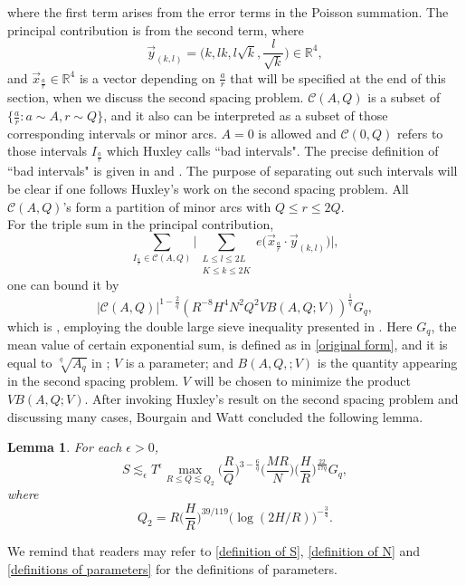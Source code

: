 \documentclass[11pt]{amsart}
\numberwithin{equation}{section}
\newtheorem{lemma}[theorem]{Lemma}
\theoremstyle{definition}
\theoremstyle{proposition}
\begin{document}
where the first term arises from the error terms in the Poisson summation. 
The principal contribution is from the second term, where 
\[
\Vec{y}_{(k,l)}=\Big(k,lk,l\sqrt{k},\frac{l}{\sqrt{k}}\Big)\in \mathbb R^4, 
\]
and $\Vec{x}_{\frac{a}{r}} \in \mathbb R^4$ is a vector depending on $\frac{a}{r}$ that will be specified at the end of this section, when we discuss the second spacing problem.
$\mathcal{C}(A,Q)$ is a subset of $\{\frac{a}{r}:a\sim A, r\sim Q\}$, and it also can be interpreted as a subset of those corresponding intervals or minor arcs. $A=0$ is allowed and $\mathcal{C}(0,Q)$ refers to those intervals 
$I_{\frac{a}{r}}$ which Huxley calls ``bad intervals". The precise definition of ``bad intervals" is given in \cite[Section 2]{HuxleyZeta5} and \cite[Section 2]{Huxley03}.
The purpose of separating out such intervals will be clear if one follows Huxley's work on the second spacing problem.  All $\mathcal{C}(A,Q)$'s  form a partition of minor arcs with $Q\le r\le 2Q$.  \\

For the triple sum in the principal contribution,
\[
\sum_{I_{\frac{a}{r}}\in \mathcal{C}(A,Q)}\Big| \mathop{\sum}\limits_{\substack{L\le l\le 2L \\K\le k\le 2K}} e\Big( \Vec{x}_{\frac{a}{r}}\cdot \Vec{y}_{(k,l)} \Big) \Big|, 
\]
one can bound it by 
\[
|\mathcal{C}(A,Q)|^{1-\frac{2}{q}} (R^{-8}H^4N^2Q^2 V B(A,Q;V))^{\frac{1}{q}}G_q,  
\]
which is \cite[(5.12)]{BourgainWatt2nd}, employing the double large sieve inequality presented in \cite[Sections 5]{BourgainWatt1st}. Here $G_q$, the mean value of certain exponential sum, is defined as in \eqref{original form}, and it is equal to $\sqrt[q]{A_q}$ in \cite{BourgainWatt2nd}; $V$ is a parameter; and $B(A,Q,;V)$ is the quantity appearing in the second spacing problem. $V$ will be chosen to minimize the product $V B(A,Q;V)$. After invoking Huxley's result on the second spacing problem \cite{Huxley03} and discussing many cases, Bourgain and Watt concluded the following lemma. 
\begin{lemma}  \cite[(5.22)]{BourgainWatt2nd}   \label{BW 5.22}
For each $\epsilon>0$, 
\[
S\lesssim_\epsilon T^\epsilon \max_{R\le Q\lesssim Q_2}  \Big(\frac{R}{Q} \Big)^{3-\frac{6}{q}} \Big(\frac{MR}{N} \Big) \Big(\frac{H}{R}\Big)^{\frac{22}{17q}} G_q, 
\]    
where \[
Q_2= R\Big(\frac{H}{R}\Big)^{39/119}\Big(\log (2H/R)\Big)^{-\frac{3}{4}}.
\]
\end{lemma}
We remind that readers may refer to  \eqref{definition of S}, \eqref{definition of N} and \eqref{definitions of parameters} for the definitions of parameters.  
\end{document}
